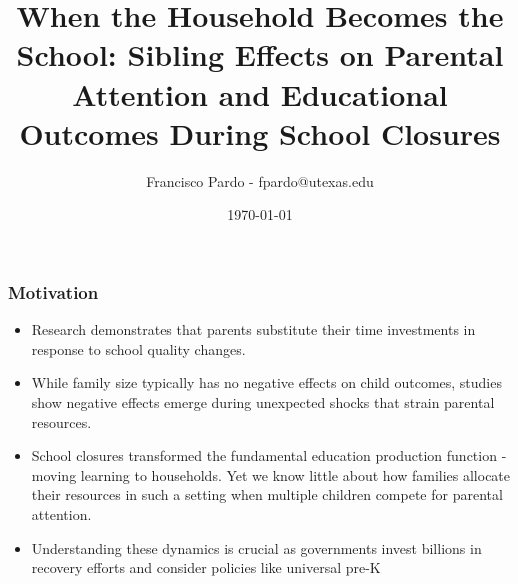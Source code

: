 \documentclass{beamer}
\title[]{When the Household Becomes the School: Sibling Effects on Parental Attention and Educational Outcomes During School Closures}
\author[Francisco Pardo] %
{Francisco Pardo - fpardo@utexas.edu \inst{1}}
\institute[UT] %
{
  \inst{1}%
  University of Texas at Austin
}
\date{\today}
\begin{document}
\frame{\titlepage}


\begin{frame}[t]
    \label{frame:motivation}
    \frametitle{Motivation}

    \begin{itemize}

        \item Research demonstrates that parents substitute their time investments in response to school quality changes. %

        \item While family size typically has no negative effects on child outcomes, studies show negative effects emerge during unexpected shocks that strain parental resources. %

        \item School closures transformed the fundamental education production function - moving learning to households. Yet we know little about how families allocate their resources in such a setting when multiple children compete for parental attention. %
        \item Understanding these dynamics is crucial as governments invest billions in recovery efforts and consider policies like universal pre-K %
        


        

    \end{itemize}
    
\end{frame}
\end{document}
